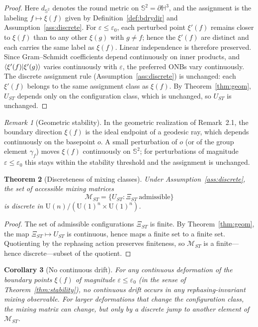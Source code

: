 \documentclass[12pt]{article}
\newtheorem{theorem}{Theorem}[section]
\newtheorem{corollary}[theorem]{Corollary}
\theoremstyle{definition}
\theoremstyle{remark}
\newtheorem{remark}[theorem]{Remark}
\newcommand{\Hthree}{\mathbb{H}^3}
\newcommand{\Sphere}{\mathbb{S}^2}
\newcommand{\U}{\mathrm{U}}
\begin{document}
\begin{proof}
Here $d_{\Sphere}$ denotes the round metric on $\Sphere=\partial\Hthree$,
and the assignment is the labeling $f\mapsto\xi(f)$ given by
Definition~\ref{def:bdrydir} and Assumption~\ref{ass:discrete}.
For $\varepsilon\leq\varepsilon_0$, each perturbed point $\xi'(f)$ remains
closer to $\xi(f)$ than to any other $\xi(g)$ with $g\neq f$;
hence the $\xi'(f)$ are distinct and each carries the same label as $\xi(f)$.
Linear independence is therefore preserved.
Since Gram--Schmidt coefficients depend continuously on inner products,
and $\braket{\xi'(f)|\xi'(g)}$ varies continuously with $\varepsilon$,
the preferred ONBs vary continuously.
The discrete assignment rule (Assumption~\ref{ass:discrete}) is unchanged:
each $\xi'(f)$ belongs to the same assignment class as $\xi(f)$.
By Theorem~\ref{thm:geom}, $U_{ST}$ depends only on the configuration
class, which is unchanged, so $U_{ST}$ is unchanged.
\end{proof}

\begin{remark}[Geometric stability]
In the geometric realization of Remark~2.1, the boundary direction
$\xi(f)$ is the ideal endpoint of a geodesic ray, which depends
continuously on the basepoint $o$.
A small perturbation of $o$ (or of the group element $\gamma_f$)
moves $\xi(f)$ continuously on $\Sphere$;
for perturbations of magnitude $\varepsilon\leq\varepsilon_0$ this
stays within the stability threshold and the assignment is unchanged.
\end{remark}

\begin{theorem}[Discreteness of mixing classes]\label{thm:discrete-classes}
Under Assumption~\ref{ass:discrete}, the set of accessible mixing matrices
\[
  \mathcal{M}_{ST} = \{U_{ST} : \Xi_{ST}\ \text{admissible}\}
\]
is discrete in $\U(n)/(\U(1)^n\times\U(1)^n)$.
\end{theorem}

\begin{proof}
The set of admissible configurations $\Xi_{ST}$ is finite.
By Theorem~\ref{thm:geom}, the map $\Xi_{ST}\mapsto U_{ST}$ is continuous,
hence maps a finite set to a finite set.
Quotienting by the rephasing action preserves finiteness, so
$\mathcal{M}_{ST}$ is a finite---hence discrete---subset of the quotient.
\end{proof}

\begin{corollary}[No continuous drift]\label{cor:nodrift}
For any continuous deformation of the boundary points $\xi(f)$ of
magnitude $\varepsilon\leq\varepsilon_0$ (in the sense of
Theorem~\ref{thm:stability}),
no continuous drift occurs in any rephasing-invariant mixing observable.
For larger deformations that change the configuration class, the mixing
matrix can change, but only by a discrete jump to another element of
$\mathcal{M}_{ST}$.
\end{corollary}
\end{document}
